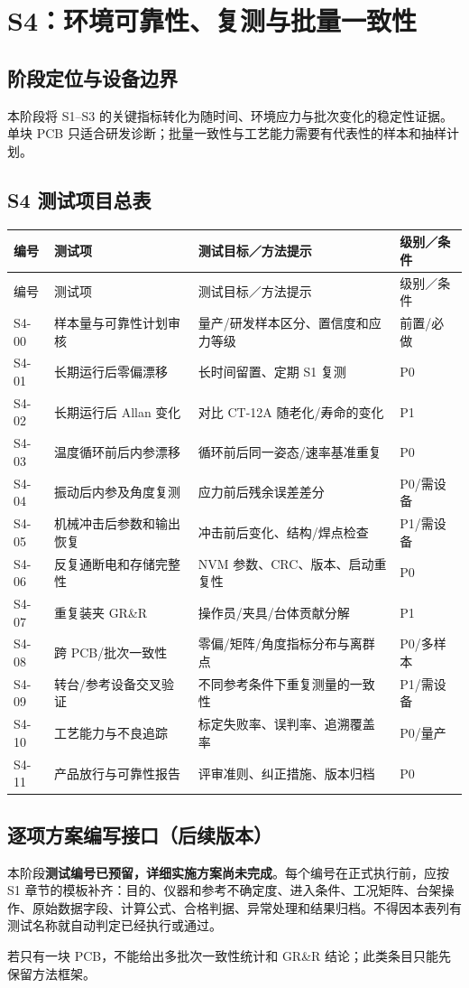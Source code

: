 \chapter{S4：环境可靠性、复测与批量一致性}
\section{阶段定位与设备边界}
本阶段将 S1--S3 的关键指标转化为随时间、环境应力与批次变化的稳定性证据。单块 PCB 只适合研发诊断；批量一致性与工艺能力需要有代表性的样本和抽样计划。
\section{S4 测试项目总表}
\small
\begin{longtable}{C{18mm}p{46mm}p{61mm}p{22mm}}
\toprule 编号 & 测试项 & 测试目标／方法提示 & 级别／条件\\\midrule\endfirsthead
\toprule 编号 & 测试项 & 测试目标／方法提示 & 级别／条件\\\midrule\endhead
S4-00 & 样本量与可靠性计划审核 & 量产/研发样本区分、置信度和应力等级 & 前置/必做\\
S4-01 & 长期运行后零偏漂移 & 长时间留置、定期 S1 复测 & P0\\
S4-02 & 长期运行后 Allan 变化 & 对比 CT-12A 随老化/寿命的变化 & P1\\
S4-03 & 温度循环前后内参漂移 & 循环前后同一姿态/速率基准重复 & P0\\
S4-04 & 振动后内参及角度复测 & 应力前后残余误差差分 & P0/需设备\\
S4-05 & 机械冲击后参数和输出恢复 & 冲击前后变化、结构/焊点检查 & P1/需设备\\
S4-06 & 反复通断电和存储完整性 & NVM 参数、CRC、版本、启动重复性 & P0\\
S4-07 & 重复装夹 GR\&R & 操作员/夹具/台体贡献分解 & P1\\
S4-08 & 跨 PCB/批次一致性 & 零偏/矩阵/角度指标分布与离群点 & P0/多样本\\
S4-09 & 转台/参考设备交叉验证 & 不同参考条件下重复测量的一致性 & P1/需设备\\
S4-10 & 工艺能力与不良追踪 & 标定失败率、误判率、追溯覆盖率 & P0/量产\\
S4-11 & 产品放行与可靠性报告 & 评审准则、纠正措施、版本归档 & P0\\
\bottomrule
\end{longtable}
\normalsize
\section{逐项方案编写接口（后续版本）}
本阶段\textbf{测试编号已预留，详细实施方案尚未完成}。每个编号在正式执行前，应按 S1 章节的模板补齐：目的、仪器和参考不确定度、进入条件、工况矩阵、台架操作、原始数据字段、计算公式、合格判据、异常处理和结果归档。不得因本表列有测试名称就自动判定已经执行或通过。
\begin{warningbox}若只有一块 PCB，不能给出多批次一致性统计和 GR\&R 结论；此类条目只能先保留方法框架。\end{warningbox}
